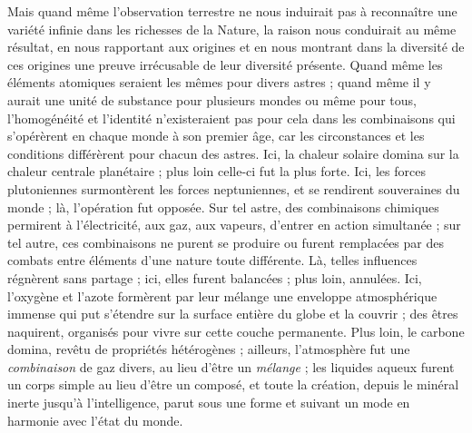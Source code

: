 \documentclass[a4paper, 11pt, oneside]{article}
\begin{document}
Mais quand même l'observation terrestre ne nous induirait pas à reconnaître une variété infinie dans les richesses de la Nature, la raison nous conduirait au même résultat, en nous rapportant aux origines et en nous montrant dans la diversité de ces origines une preuve irrécusable de leur diversité présente. Quand même les éléments atomiques seraient les mêmes pour divers astres ; quand même il y aurait une unité de substance pour plusieurs mondes ou même pour tous, l'homogénéité et l'identité n'existeraient pas pour cela dans les combinaisons qui s'opérèrent en chaque monde à son premier âge, car les circonstances et les conditions différèrent pour chacun des astres. Ici, la chaleur solaire domina sur la chaleur centrale planétaire ; plus loin celle-ci fut la plus forte. Ici, les forces plutoniennes surmontèrent les forces neptuniennes, et se rendirent souveraines du monde ; là, l'opération fut opposée. Sur tel astre, des combinaisons chimiques permirent à l'électricité, aux gaz, aux vapeurs, d'entrer en action simultanée ; sur tel autre, ces combinaisons ne purent se produire ou furent remplacées par des combats entre éléments d'une nature toute différente. Là, telles influences régnèrent sans partage ; ici, elles furent balancées ; plus loin, annulées. Ici, l'oxygène et l'azote formèrent par leur mélange une enveloppe atmosphérique immense qui put s'étendre sur la surface entière du globe et la couvrir ; des êtres naquirent, organisés pour vivre sur cette couche permanente. Plus loin, le carbone domina, revêtu de propriétés hétérogènes ; ailleurs, l'atmosphère fut une \emph{combinaison} de gaz divers, au lieu d'être un \emph{mélange} ; les liquides aqueux furent un corps simple au lieu d'être un composé, et toute la création, depuis le minéral inerte jusqu'à l'intelligence, parut sous une forme et suivant un mode en harmonie avec l'état du monde.
\end{document}
